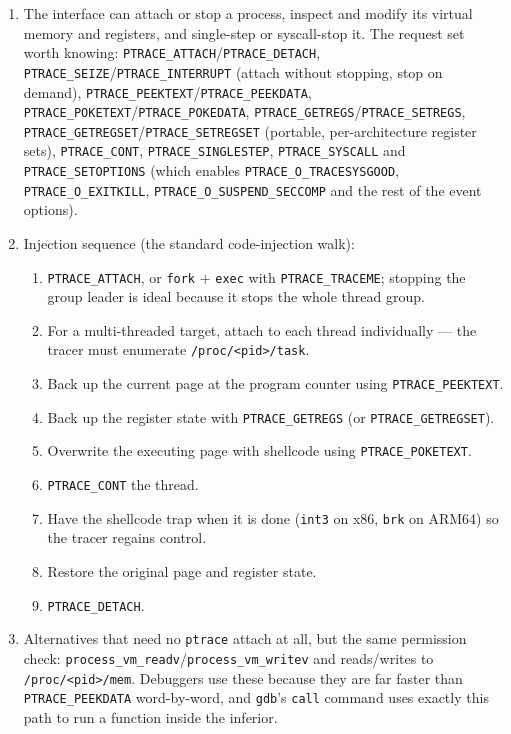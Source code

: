 \documentclass[12pt]{Training}
\begin{document}
\begin{enumerate}
\begin{enumerate}
        \item The interface can attach or stop a process, inspect and modify its virtual memory and registers, and single-step or syscall-stop it. The request set worth knowing: \lstinline{PTRACE_ATTACH}/\lstinline{PTRACE_DETACH}, \lstinline{PTRACE_SEIZE}/\lstinline{PTRACE_INTERRUPT} (attach without stopping, stop on demand), \lstinline{PTRACE_PEEKTEXT}/\lstinline{PTRACE_PEEKDATA}, \lstinline{PTRACE_POKETEXT}/\lstinline{PTRACE_POKEDATA}, \lstinline{PTRACE_GETREGS}/\lstinline{PTRACE_SETREGS}, \lstinline{PTRACE_GETREGSET}/\lstinline{PTRACE_SETREGSET} (portable, per-architecture register sets), \lstinline{PTRACE_CONT}, \lstinline{PTRACE_SINGLESTEP}, \lstinline{PTRACE_SYSCALL} and \lstinline{PTRACE_SETOPTIONS} (which enables \lstinline{PTRACE_O_TRACESYSGOOD}, \lstinline{PTRACE_O_EXITKILL}, \lstinline{PTRACE_O_SUSPEND_SECCOMP} and the rest of the event options).
        \item Injection sequence (the standard code-injection walk):
        \begin{enumerate}
            \item \lstinline{PTRACE_ATTACH}, or \lstinline{fork} $+$ \lstinline{exec} with \lstinline{PTRACE_TRACEME}; stopping the group leader is ideal because it stops the whole thread group.
            \item For a multi-threaded target, attach to each thread individually --- the tracer must enumerate \lstinline{/proc/<pid>/task}.
            \item Back up the current page at the program counter using \lstinline{PTRACE_PEEKTEXT}.
            \item Back up the register state with \lstinline{PTRACE_GETREGS} (or \lstinline{PTRACE_GETREGSET}).
            \item Overwrite the executing page with shellcode using \lstinline{PTRACE_POKETEXT}.
            \item \lstinline{PTRACE_CONT} the thread.
            \item Have the shellcode trap when it is done (\lstinline{int3} on x86, \lstinline{brk} on ARM64) so the tracer regains control.
            \item Restore the original page and register state.
            \item \lstinline{PTRACE_DETACH}.
        \end{enumerate}
        \item Alternatives that need no \lstinline{ptrace} attach at all, but the same permission check: \lstinline{process_vm_readv}/\lstinline{process_vm_writev} and reads/writes to \lstinline{/proc/<pid>/mem}. Debuggers use these because they are far faster than \lstinline{PTRACE_PEEKDATA} word-by-word, and \lstinline{gdb}'s \lstinline{call} command uses exactly this path to run a function inside the inferior.

\end{enumerate}
\end{enumerate}
\end{document}
